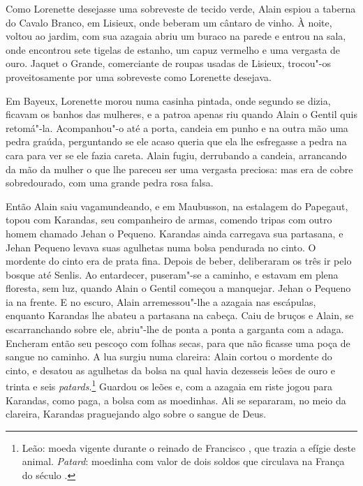 Como Lorenette desejasse uma sobreveste de tecido verde, Alain espiou a
taberna do Cavalo Branco, em Lisieux, onde beberam um cântaro de vinho. À
noite, voltou ao jardim, com sua azagaia abriu um buraco na parede e
entrou na sala, onde encontrou sete tigelas de estanho, um capuz vermelho
e uma vergasta de ouro. Jaquet o Grande, comerciante de roupas usadas de
Lisieux, trocou"-os proveitosamente por uma sobreveste como Lorenette
desejava.

Em Bayeux, Lorenette morou numa casinha pintada, onde segundo se dizia,
ficavam os banhos das mulheres, e a patroa apenas riu quando Alain o
Gentil quis retomá"-la. Acompanhou"-o até a porta, candeia em punho e na
outra mão uma pedra graúda, perguntando se ele acaso queria que ela lhe
esfregasse a pedra na cara para ver se ele fazia careta. Alain fugiu,
derrubando a candeia, arrancando da mão da mulher o que lhe pareceu ser
uma vergasta preciosa: mas era de cobre sobredourado, com uma grande pedra
rosa falsa.

Então Alain saiu vagamundeando, e em Maubusson, na estalagem do Papegaut,
topou com Karandas, seu companheiro de armas, comendo tripas com outro
homem chamado Jehan o Pequeno. Karandas ainda carregava sua partasana, e
Jehan Pequeno levava suas agulhetas numa bolsa pendurada no cinto. O
mordente do cinto era de prata fina. Depois de beber, deliberaram os três
ir pelo bosque até Senlis. Ao entardecer, puseram"-se a caminho, e estavam
em plena floresta, sem luz, quando Alain o Gentil começou a manquejar.
Jehan o Pequeno ia na frente. E no escuro, Alain arremessou"-lhe a azagaia
nas escápulas, enquanto Karandas lhe abateu a partasana na cabeça. Caiu de
bruços e Alain, se escarranchando sobre ele, abriu"-lhe de ponta a ponta a
garganta com a adaga. Encheram então seu pescoço com folhas secas, para
que não ficasse uma poça de sangue no caminho. A lua surgiu numa clareira:
Alain cortou o mordente do cinto, e desatou as agulhetas da bolsa na qual
havia dezesseis leões de ouro e trinta e seis \textit{patards}.\footnote{
Leão: moeda vigente durante o reinado de Francisco , que trazia a efígie
deste animal. \textit{Patard}: moedinha com valor de dois soldos que
circulava na França do século .} Guardou os leões e, com a azagaia em
riste jogou para Karandas, como paga, a bolsa com as moedinhas. Ali se
separaram, no meio da clareira, Karandas praguejando algo sobre o sangue
de Deus.

